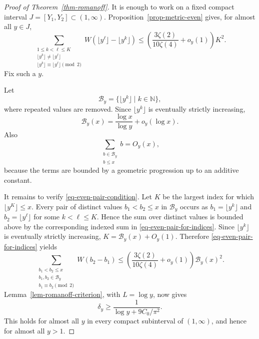 \documentclass[11pt,reqno]{amsart}
\numberwithin{equation}{section}
\begin{document}
    \begin{proof}[Proof of Theorem~\ref{thm-romanoff}]
        It is enough to work on a fixed compact interval $J=[Y_1,Y_2]\subset(1,\infty)$. Proposition~\ref{prop-metric-even} gives, for almost all $y\in J$,
        \begin{equation}\label{eq-even-pair-for-indices}
            \sum_{\substack{1\le k<\ell\le K\\
                    \lfloor y^k\rfloor\ne\lfloor y^\ell\rfloor\\
                    \lfloor y^k\rfloor\equiv\lfloor y^\ell\rfloor\pmod2}}
            W\!\left(\lfloor y^\ell\rfloor-\lfloor y^k\rfloor\right)
            \le
            \left(\frac{3\zeta(2)}{10\zeta(4)}+o_y(1)\right)K^2.
        \end{equation}
        Fix such a $y$.

        Let
        $$
        \mathcal{B}_y=\{\lfloor y^k\rfloor\mid k\in\mathbb{N}\},
        $$
        where repeated values are removed. Since $\lfloor y^k\rfloor$ is eventually strictly increasing,
        $$
        \mathcal{B}_y(x)=\frac{\log x}{\log y}+o_y(\log x).
        $$
        Also
        $$
        \sum_{\substack{b\in\mathcal{B}_y\\b\le x}}b=O_y(x),
        $$
        because the terms are bounded by a geometric progression up to an additive constant.

        It remains to verify \eqref{eq-even-pair-condition}. Let $K$ be the largest index for which $\lfloor y^K\rfloor\le x$. Every pair of distinct values $b_1<b_2\le x$ in $\mathcal{B}_y$ occurs as $b_1=\lfloor y^k\rfloor$ and $b_2=\lfloor y^\ell\rfloor$ for some $k<\ell\le K$. Hence the sum over distinct values is bounded above by the corresponding indexed sum in \eqref{eq-even-pair-for-indices}. Since $\lfloor y^k\rfloor$ is eventually strictly increasing, $K=\mathcal{B}_y(x)+O_y(1)$. Therefore \eqref{eq-even-pair-for-indices} yields
        $$
        \sum_{\substack{b_1<b_2\le x\\
                b_1,b_2\in\mathcal{B}_y\\
                b_1\equiv b_2\pmod2}}
        W(b_2-b_1)
        \le
        \left(\frac{3\zeta(2)}{10\zeta(4)}+o_y(1)\right)\mathcal{B}_y(x)^2.
        $$
        Lemma~\ref{lem-romanoff-criterion}, with $L=\log y$, now gives
        $$
        \delta_y\ge \frac{1}{\log y+9C_0/\pi^2}.
        $$
        This holds for almost all $y$ in every compact subinterval of $(1,\infty)$, and hence for almost all $y>1$.
    \end{proof}
\end{document}
